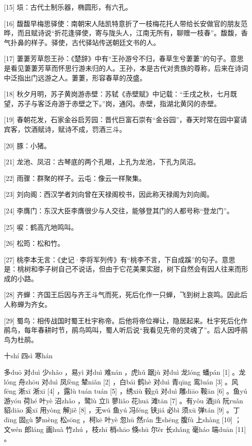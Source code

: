 \documentclass[12pt,UTF8]{ctexbook}
\begin{document}
[15] 埙：古代土制乐器，椭圆形，有六孔。

[16] 馥馥早梅思驿使：南朝宋人陆凯特意折了一枝梅花托人带给长安做官的朋友范晔，而且赋诗说“折花逢驿使，寄与陇头人，江南无所有，聊赠一枝春”。馥馥，香气扑鼻的样子。驿使，古代驿站传送朝廷文书的人。

[17] 萋萋芳草怨王孙：《楚辞》中有“王孙游兮不归，春草生兮萋萋”的句子。意思是看见萋萋芳草而怀思行游未归的人。王孙，本是古代对贵族的尊称，后来在诗词中泛指出门远游之人。萋萋，形容春草的茂盛。

[18] 秋夕月明，苏子黄岗游赤壁：苏轼《赤壁赋》中记载：“壬戌之秋，七月既望，苏子与客泛舟游于赤壁之下。”岗，通冈。赤壁，指湖北黄冈的赤壁。

[19] 春朝花发，石家金谷启芳园：晋代巨富石崇有“金谷园”，春天时常在园中宴请宾客，饮酒赋诗，赋诗不成，罚酒三斗。

[20] 豚：小猪。

[21] 龙池、凤沼：古琴底的两个孔眼，上孔为龙池，下孔为凤沼。

[22] 雨骤：群聚的样子。云屯：像云一样聚集。

[23] 刘向阁：西汉学者刘向曾在天禄阁校书，因此称天禄阁为刘向阁。

[24] 李膺门：东汉大臣李膺很少与人交往，能够登其门的人都号称“登龙门”。

[25] 唳：鹤高亢地鸣叫。

[26] 松筠：松和竹。

[27] 桃李本无言：《史记·李将军列传》有“桃李不言，下自成蹊”的句子。意思是：桃树和李子树自己不说话，但由于它花美果实甜，树下自然会有因人往来而形成的小路。

[28] 齐蝉：齐国王后因与齐王斗气而死，死后化作一只蝉，飞到树上哀鸣。因此后人称蝉为齐女。

[29] 蜀鸟：相传战国时蜀王杜宇称帝。后他将帝位禅让，隐居起来。杜宇死后化作鹃鸟，每年春耕时节，鹃鸟鸣叫，蜀人听后说“我看见先帝的灵魂了”。后人因呼鹃鸟为杜鹃。





十shí 四sì 寒hán


多duō 对duì 少shǎo ，易yì 对duì 难nán ，虎hǔ 踞jù 对duì 龙lóng 蟠pán [1] 。龙lóng 舟zhōu 对duì 凤fèng 辇niǎn [2] ，白bái 鹤hè 对duì 青qīng 鸾luán [3] 。风fēng 淅xī 淅xī [4] ，露lù tuán tuán [5] ，绣xiù 毂gǔ 对duì 雕diāo 鞍ān [6] 。鱼yú 游yóu 荷hé 叶yè 沼zhǎo ，鹭lù 立lì 蓼liǎo 花huā 滩tān [7] 。有yǒu 酒jiǔ 阮ruǎn 貂diāo 奚xī 用yòng 解jiě [8] ，无wú 鱼yú 冯féng 铗jiá 必bì 须xū 弹tán [9] 。丁dīng 固gù 梦mèng 松sōng ，柯kē 叶yè 忽hū 然rán 生shēng 腹fù 上shàng [10] ；文wén 郎láng 画huà 竹zhú ，枝zhī 梢shāo 倏shū 尔ěr 长zhǎng 毫háo 端duān [11] 。
\end{document}
